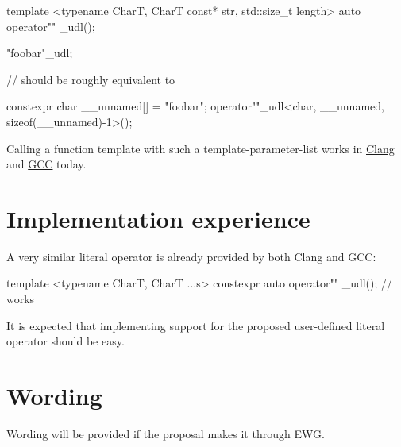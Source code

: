 \documentclass{wg21}
\begin{document}
\begin{cpp}
template <typename CharT, CharT const* str, std::size_t length>
auto operator"" _udl();

"foobar"_udl;

// should be roughly equivalent to

constexpr char __unnamed[] = "foobar";
operator""_udl<char, __unnamed, sizeof(__unnamed)-1>();
\end{cpp}

Calling a function template with such a template-parameter-list works in
\href{https://wandbox.org/permlink/RBV6abYfNee94wlW}{Clang} and
\href{https://wandbox.org/permlink/rZEY8vDB5mHMPmmd}{GCC} today.


\section{Implementation experience}
A very similar literal operator is already provided by both Clang and GCC:

\begin{cpp}
  template <typename CharT, CharT ...s>
  constexpr auto operator"" _udl(); // works
\end{cpp}

It is expected that implementing support for the proposed user-defined literal
operator should be easy.


\section{Wording}
Wording will be provided if the proposal makes it through EWG.
\end{document}
